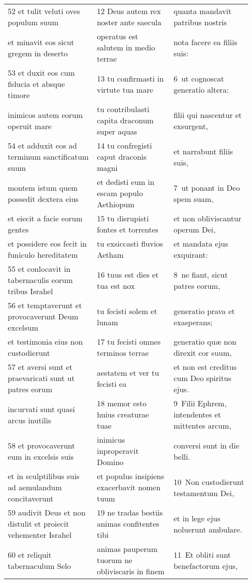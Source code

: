 \documentclass{article}
\begin{document}
\begin{longtable}{@{}p{}p{}p{}@{}}
52 et tulit veluti oves populum suum	&	12 Deus autem rex noster ante saecula	&	quanta mandavit patribus nostris	\\
et minavit eos sicut gregem in deserto	&	operatus est salutem in medio terrae	&	nota facere ea filiis suis:	\\
53 et duxit eos cum fiducia et absque timore	&	13 tu confirmasti in virtute tua mare	&	6 ut cognoscat generatio altera:	\\
inimicos autem eorum operuit mare	&	tu contribulasti capita draconum super aquas	&	filii qui nascentur et exsurgent,	\\
54 et adduxit eos ad terminum sanctificatum suum	&	14 tu confregisti caput draconis magni	&	et narrabunt filiis suis,	\\
montem istum quem possedit dextera eius	&	et dedisti eum in escam populo Aethiopum	&	7 ut ponant in Deo spem suam,	\\
et eiecit a facie eorum gentes	&	15 tu disrupisti fontes et torrentes	&	et non obliviscantur operum Dei,	\\
et possidere eos fecit in funiculo hereditatem	&	tu exsiccasti fluvios Aetham	&	et mandata ejus exquirant:	\\
55 et conlocavit in tabernaculis eorum tribus Israhel	&	16 tuus est dies et tua est nox	&	8 ne fiant, sicut patres eorum,	\\
56 et temptaverunt et provocaverunt Deum excelsum	&	tu fecisti solem et lunam	&	generatio prava et exasperans;	\\
et testimonia eius non custodierunt	&	17 tu fecisti omnes terminos terrae	&	generatio quæ non direxit cor suum,	\\
57 et aversi sunt et praevaricati sunt ut patres eorum	&	aestatem et ver tu fecisti ea	&	et non est creditus cum Deo spiritus ejus.	\\
incurvati sunt quasi arcus inutilis	&	18 memor esto huius creaturae tuae	&	9 Filii Ephrem, intendentes et mittentes arcum,	\\
58 et provocaverunt eum in excelsis suis	&	inimicus inproperavit Domino	&	conversi sunt in die belli.	\\
et in sculptilibus suis ad aemulandum concitaverunt	&	et populus insipiens exacerbavit nomen tuum	&	10 Non custodierunt testamentum Dei,	\\
59 audivit Deus et non distulit et proiecit vehementer Israhel	&	19 ne tradas bestiis animas confitentes tibi	&	et in lege ejus noluerunt ambulare.	\\
60 et reliquit tabernaculum Selo	&	animas pauperum tuorum ne obliviscaris in finem	&	11 Et obliti sunt benefactorum ejus,	\\

\end{longtable}
\end{document}
